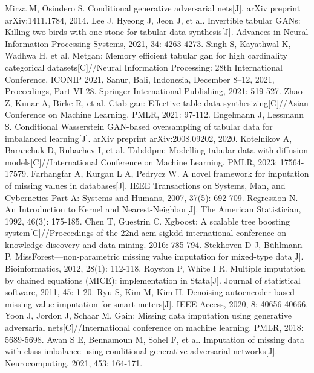 \documentclass[final,1p,times]{elsarticle}
\begin{document}
\begin{thebibliography}{00}
Mirza M, Osindero S. Conditional generative adversarial nets[J]. arXiv preprint arXiv:1411.1784, 2014.
Lee J, Hyeong J, Jeon J, et al. Invertible tabular GANs: Killing two birds with one stone for tabular data synthesis[J]. Advances in Neural Information Processing Systems, 2021, 34: 4263-4273.
Singh S, Kayathwal K, Wadhwa H, et al. Metgan: Memory efficient tabular gan for high cardinality categorical datasets[C]//Neural Information Processing: 28th International Conference, ICONIP 2021, Sanur, Bali, Indonesia, December 8–12, 2021, Proceedings, Part VI 28. Springer International Publishing, 2021: 519-527.
Zhao Z, Kunar A, Birke R, et al. Ctab-gan: Effective table data synthesizing[C]//Asian Conference on Machine Learning. PMLR, 2021: 97-112.
Engelmann J, Lessmann S. Conditional Wasserstein GAN-based oversampling of tabular data for imbalanced learning[J]. arXiv preprint arXiv:2008.09202, 2020.
Kotelnikov A, Baranchuk D, Rubachev I, et al. Tabddpm: Modelling tabular data with diffusion models[C]//International Conference on Machine Learning. PMLR, 2023: 17564-17579.
Farhangfar A, Kurgan L A, Pedrycz W. A novel framework for imputation of missing values in databases[J]. IEEE Transactions on Systems, Man, and Cybernetics-Part A: Systems and Humans, 2007, 37(5): 692-709.
Regression N. An Introduction to Kernel and Nearest-Neighbor[J]. The American Statistician, 1992, 46(3): 175-185.
Chen T, Guestrin C. Xgboost: A scalable tree boosting system[C]//Proceedings of the 22nd acm sigkdd international conference on knowledge discovery and data mining. 2016: 785-794.
Stekhoven D J, Bühlmann P. MissForest—non-parametric missing value imputation for mixed-type data[J]. Bioinformatics, 2012, 28(1): 112-118.
Royston P, White I R. Multiple imputation by chained equations (MICE): implementation in Stata[J]. Journal of statistical software, 2011, 45: 1-20.
Ryu S, Kim M, Kim H. Denoising autoencoder-based missing value imputation for smart meters[J]. IEEE Access, 2020, 8: 40656-40666.
Yoon J, Jordon J, Schaar M. Gain: Missing data imputation using generative adversarial nets[C]//International conference on machine learning. PMLR, 2018: 5689-5698.
Awan S E, Bennamoun M, Sohel F, et al. Imputation of missing data with class imbalance using conditional generative adversarial networks[J]. Neurocomputing, 2021, 453: 164-171.

\end{thebibliography}
\end{document}
